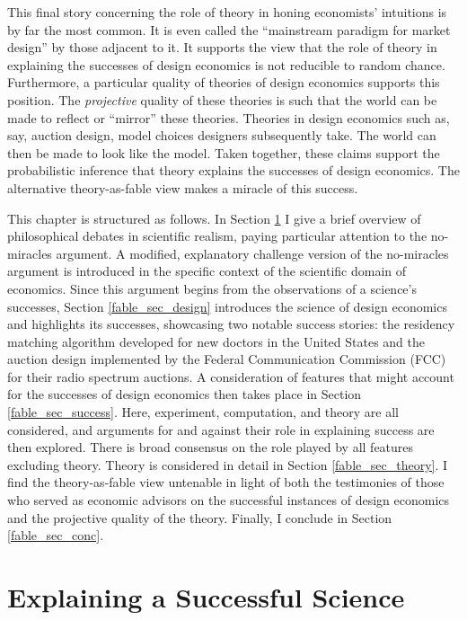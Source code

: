 This final story concerning the role of theory in honing economists' intuitions is by far the most common. It is even called the ``mainstream paradigm for market design'' \autocite[10]{sönmez2023minimalist} by those adjacent to it. It supports the view that the role of theory in explaining the successes of design economics is not reducible to random chance. Furthermore, a particular quality of theories of design economics supports this position. The \textit{projective} quality of these theories is such that the world can be made to reflect or ``mirror'' \autocite{guala2001} these theories. Theories in design economics such as, say, auction design, model choices designers subsequently take. The world can then be made to look like the model. Taken together, these claims support the probabilistic inference that theory explains the successes of design economics. The alternative theory-as-fable view makes a miracle of this success.

This chapter is structured as follows. In Section \ref{fable_sec_explain} I give a brief overview of philosophical debates in scientific realism, paying particular attention to the no-miracles argument. A modified, explanatory challenge version of the no-miracles argument is introduced in the specific context of the scientific domain of economics. Since this argument begins from the observations of a science's successes, Section \ref{fable_sec_design} introduces the science of design economics and highlights its successes, showcasing two notable success stories: the residency matching algorithm developed for new doctors in the United States and the auction design implemented by the Federal Communication Commission (FCC) for their radio spectrum auctions. A consideration of features that might account for the successes of design economics then takes place in Section \ref{fable_sec_success}. Here, experiment, computation, and theory are all considered, and arguments for and against their role in explaining success are then explored. There is broad consensus on the role played by all features excluding theory. Theory is considered in detail in Section \ref{fable_sec_theory}. I find the theory-as-fable view untenable in light of both the testimonies of those who served as economic advisors on the successful instances of design economics and the projective quality of the theory. Finally, I conclude in Section \ref{fable_sec_conc}.





\section{Explaining a Successful Science}\label{fable_sec_explain}

